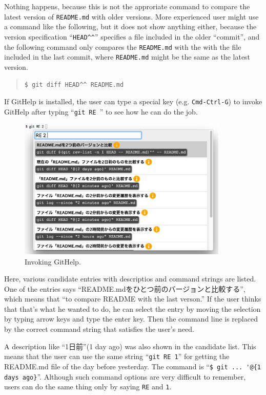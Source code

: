 \documentclass{sigchi}
\def\GH{\textsf{GitHelp}}
\begin{document}
Nothing happens, because this is not the approriate command
to compare the latest version of \texttt{README.md}
with older versions.
%
More experienced user might use a command like the following,
but it does not show anything either, because the version specification
``\verb|HEAD^^|''
specifies a file included in the older ``commit'',
and the following command only compares the \texttt{README.md}
with the with the file included in the last commit, where
\texttt{README.md} might be the same as the latest version.

\begin{quotation}
  \verb|$ git diff HEAD^^ README.md|
\end{quotation}

If {\GH} is installed,
the user can type a special key (e.g. \texttt{Cmd-Ctrl-G}) to invoke {\GH}
after typing ``\verb|git RE |'' to see how he can do the job.

\begin{figure}[h]
  \includegraphics[width=10cm,bb=-100 -100 1190 766]{figures/githelp1.png}
  \caption{Invoking {\GH}.}
  \label{bash1}
\end{figure}

Here, various candidate entries with
descriptios and command strings are listed.
One of the entries says ``README.mdをひとつ前のバージョンと比較する'',
which means that ``to compare README with the last verson.''
%
If the user thinks that that's what he wanted to do,
he can select the entry by moving the selection by typing arrow keys
and type the enter key.
Then the command line is replaced by the correct command string
that satisfies the user's need.

A description like ``1日前''(1 day ago) was also shown in the candidate list.
This means that the user can use the same string ``\texttt{git RE 1}''
for getting the README.md file of the day before yesterday.
The command is ``\verb|$ git ... '@{1 days ago}|''.
Although such command options are very difficult to remember,
users can do the same thing only by saying \texttt{RE} and \texttt{1}.
\end{document}
